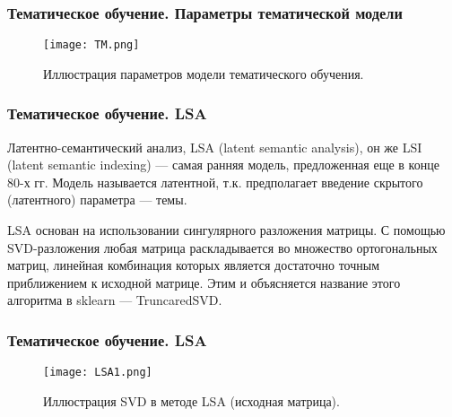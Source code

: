 \documentclass[notheorems, handout]{beamer}
\begin{document}
	\begin{frame}
	\frametitle{Тематическое обучение. Параметры тематической модели }
	

\begin{figure}[H]
	\begin{center}
		\texttt{[image: TM.png]}
		\caption{Иллюстрация параметров модели тематического обучения.}
	\end{center}
\end{figure}
	\end{frame}
	
	\begin{frame}
	\frametitle{Тематическое обучение. LSA}
	
Латентно-семантический анализ, LSA (latent semantic analysis), он же LSI (latent semantic indexing) --- самая ранняя модель, предложенная еще в конце 80-х гг. Модель называется латентной, т.к. предполагает введение скрытого (латентного) параметра — темы.

LSA основан на использовании сингулярного разложения матрицы. С помощью SVD-разложения любая матрица раскладывается во множество ортогональных матриц, линейная комбинация которых является достаточно точным приближением к исходной матрице. Этим и объясняется название этого алгоритма в sklearn — TruncaredSVD.


	\end{frame}
	
		\begin{frame}
	\frametitle{Тематическое обучение. LSA}
	

\begin{figure}[H]
	\begin{center}
		\texttt{[image: LSA1.png]}
		\caption{Иллюстрация SVD в методе LSA (исходная матрица).}
	\end{center}
\end{figure}

	\end{frame}
	
\end{document}
